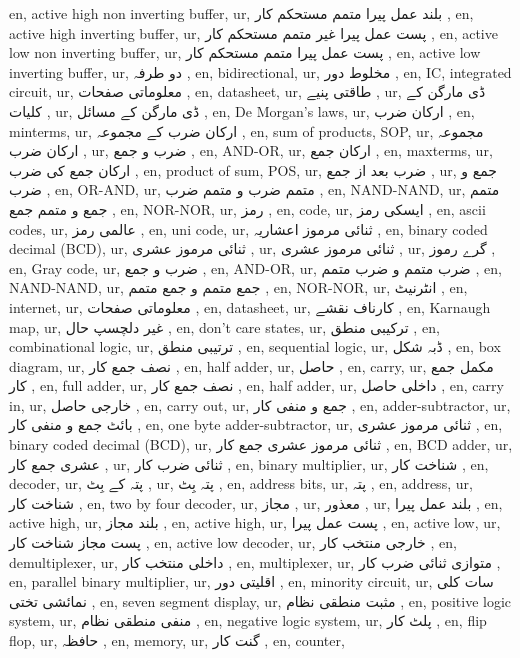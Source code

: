 en, active high non inverting buffer,
ur, بلند عمل پیرا متمم مستحکم کار ,
en, active high inverting buffer,
ur, پست عمل پیرا غیر متمم مستحکم کار ,
en, active low non inverting buffer,
ur, پست عمل پیرا متمم مستحکم کار ,
en, active low inverting buffer,
ur,  دو طرفہ  ,
en, bidirectional,
ur,  مخلوط دور  ,
en, IC, integrated circuit,
ur, معلوماتی صفحات ,
en, datasheet,
ur, طاقتی پنیے ,
ur,  ڈی مارگن کے کلیات  ,
ur, ڈی مارگن کے مسائل ,
en, De Morgan's laws,
ur, ارکان ضرب ,
en, minterms,
ur, ارکان ضرب کے مجموعہ  ,
en, sum of products, SOP,
ur, مجموعہ ارکان ضرب  ,
ur, ضرب و جمع ,
en, AND-OR,
ur,  ارکان جمع ,
en, maxterms,
ur, ارکان جمع کی ضرب  ,
en, product of sum, POS,
ur, ضرب بعد از جمع  ,
ur, جمع و ضرب ,
en, OR-AND,
ur, متمم ضرب و متمم ضرب ,
en, NAND-NAND,
ur, متمم جمع و متمم جمع  ,
en, NOR-NOR,
ur, رمز ,
en, code,
ur, ایسکی رمز ,
en, ascii codes,
ur, عالمی رمز ,
en, uni code,
ur, ثنائی مرموز اعشاریہ ,
en, binary coded decimal (BCD),
ur, ثنائی مرموز عشری ,
ur,  ثنائی مرموز عشری  ,
ur,  گرے رموز  ,
en, Gray code,
ur,  ضرب و جمع  ,
en, AND-OR,
ur, ضرب متمم و ضرب متمم  ,
en, NAND-NAND,
ur, جمع متمم و جمع متمم  ,
en, NOR-NOR,
ur, انٹرنیٹ  ,
en, internet,
ur,  معلوماتی صفحات  ,
en, datasheet,
ur,  کارناف نقشے  ,
en, Karnaugh map,
ur, غیر دلچسپ حال  ,
en, don't care states,
ur, ترکیبی منطق ,
en, combinational logic,
ur,  ترتیبی منطق ,
en, sequential logic,
ur, ڈبہ شکل ,
en, box diagram,
ur, نصف جمع کار ,
en, half adder,
ur, حاصل ,
en, carry,
ur,  مکمل جمع کار ,
en, full adder,
ur, نصف جمع کار ,
en, half adder,
ur, داخلی حاصل ,
en, carry in,
ur, خارجی حاصل ,
en, carry out,
ur,  جمع و منفی کار  ,
en, adder-subtractor,
ur,  بائٹ جمع و منفی کار  ,
en, one byte adder-subtractor,
ur, ثنائی مرموز عشری ,
en, binary coded decimal (BCD),
ur,  ثنائی مرموز عشری جمع کار  ,
en, BCD adder,
ur,  عشری جمع کار  ,
ur,  ثنائی ضرب کار  ,
en, binary multiplier,
ur, شناخت کار ,
en, decoder,
ur, پتہ کے بِٹ ,
ur, پتہ بِٹ ,
en, address bits,
ur, پتہ ,
en, address,
ur,  شناخت کار ,
en, two by four decoder,
ur,  مجاز  ,
ur, معذور  ,
ur,  بلند عمل پیرا ,
en, active high,
ur, بلند مجاز ,
en, active high,
ur, پست عمل پیرا ,
en, active low,
ur, پست مجاز شناخت کار ,
en, active low decoder,
ur,  خارجی منتخب کار  ,
en, demultiplexer,
ur, داخلی منتخب کار ,
en, multiplexer,
ur, متوازی ثنائی ضرب کار  ,
en, parallel binary multiplier,
ur, اقلیتی دور  ,
en, minority circuit,
ur, سات کلی نمائشی تختی  ,
en, seven segment display,
ur,  مثبت منطقی نظام ,
en, positive logic system,
ur, منفی منطقی نظام ,
en, negative logic system,
ur, پلٹ کار ,
en, flip flop,
ur, حافظہ ,
en, memory,
ur, گنت کار ,
en, counter,
